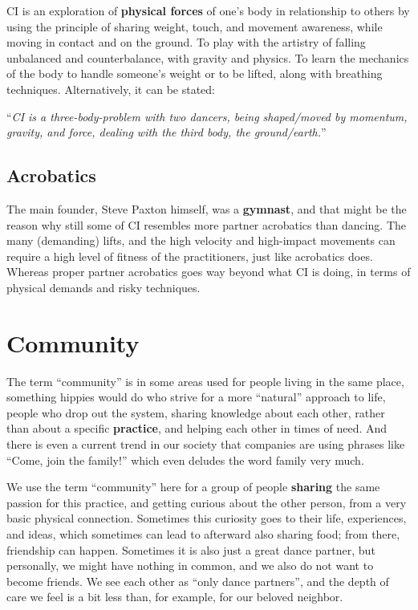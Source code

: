 CI is an exploration of \textbf{physical forces} of one's body in relationship to others by using the principle of sharing weight, touch, and movement awareness, while moving in contact and on the ground.
To play with the artistry of falling unbalanced and counterbalance, with gravity and physics.
To learn the mechanics of the body to handle someone's weight or to be lifted, along with breathing techniques.
Alternatively, it can be stated:

\begin{center}
	``\textit{CI is a three-body-problem with two dancers, being shaped/moved by momentum, gravity, and force, dealing with the third body, the ground/earth.}''
\end{center}

\subsection{Acrobatics}\label{subsec:acrobatics}

The main founder, Steve Paxton himself, was a \textbf{gymnast}, and that might be the reason why still some of CI resembles more partner acrobatics than dancing.
The many (demanding) lifts, and the high velocity and high-impact movements can require a high level of fitness of the practitioners, just like acrobatics does.
Whereas proper partner acrobatics goes way beyond what CI is doing, in terms of physical demands and risky techniques.

\section{Community}\label{sec:community}

The term ``community'' is in some areas used for people living in the same place, something hippies would do who strive for a more ``natural'' approach to life, people who drop out the system, sharing knowledge about each other, rather than about a specific \textbf{practice}, and helping each other in times of need.
And there is even a current trend in our society that companies are using phrases like ``Come, join the family!'' which even deludes the word family very much.

We use the term ``community'' here for a group of people \textbf{sharing} the same passion for this practice, and getting curious about the other person, from a very basic physical connection.
Sometimes this curiosity goes to their life, experiences, and ideas, which sometimes can lead to afterward also sharing food; from there, friendship can happen.
Sometimes it is also just a great dance partner, but personally, we might have nothing in common, and we also do not want to become friends.
We see each other as ``only dance partners'', and the depth of care we feel is a bit less than, for example, for our beloved neighbor.

